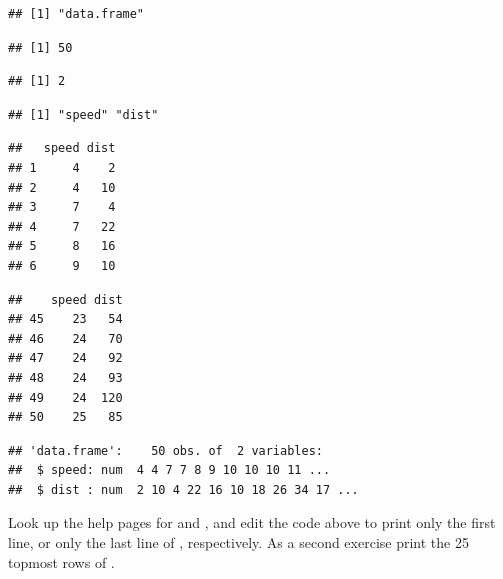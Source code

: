 \documentclass[krantz2]{krantz}\usepackage{knitr}%
\begin{document}
\begin{knitrout}\footnotesize
{}\color{fgcolor}\begin{kframe}
\begin{alltt}
\end{alltt}
\begin{verbatim}
## [1] "data.frame"
\end{verbatim}
\begin{alltt}
\end{alltt}
\begin{verbatim}
## [1] 50
\end{verbatim}
\begin{alltt}
\end{alltt}
\begin{verbatim}
## [1] 2
\end{verbatim}
\begin{alltt}
\end{alltt}
\begin{verbatim}
## [1] "speed" "dist"
\end{verbatim}
\begin{alltt}
\end{alltt}
\begin{verbatim}
##   speed dist
## 1     4    2
## 2     4   10
## 3     7    4
## 4     7   22
## 5     8   16
## 6     9   10
\end{verbatim}
\begin{alltt}
\end{alltt}
\begin{verbatim}
##    speed dist
## 45    23   54
## 46    24   70
## 47    24   92
## 48    24   93
## 49    24  120
## 50    25   85
\end{verbatim}
\begin{alltt}
\end{alltt}
\begin{verbatim}
## 'data.frame':	50 obs. of  2 variables:
##  $ speed: num  4 4 7 7 8 9 10 10 10 11 ...
##  $ dist : num  2 10 4 22 16 10 18 26 34 17 ...
\end{verbatim}
\end{kframe}
\end{knitrout}

\begin{playground}
Look up the help pages for  and , and edit the code above to print only the first line, or only the last line of , respectively. As a second exercise print the 25 topmost rows of .
\end{playground}
\end{document}
